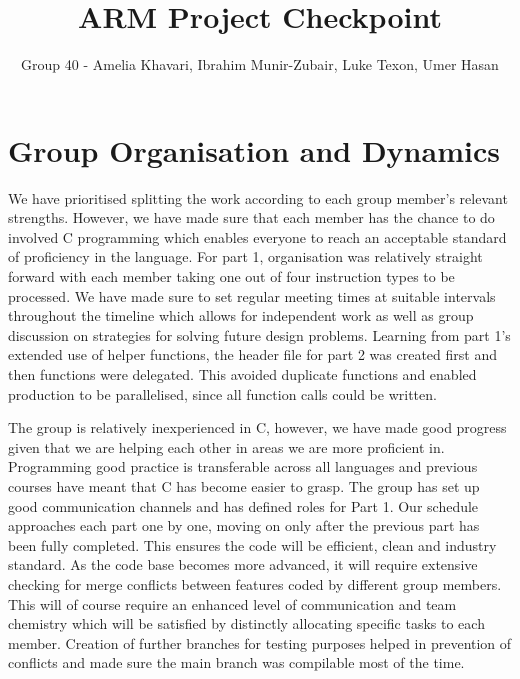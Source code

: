 \documentclass[11pt]{article}
\begin{document}
\title{ARM Project Checkpoint}
\author{Group 40 - Amelia Khavari, Ibrahim Munir-Zubair, Luke Texon, Umer Hasan}

\maketitle

\section{Group Organisation and Dynamics}

We have prioritised splitting the work according to each group member's relevant strengths. However, we have made sure that each member has the chance to do involved C programming which enables everyone to reach an acceptable standard of proficiency in the language. For part 1, organisation was relatively straight forward with each member taking one out of four instruction types to be processed. We have made sure to set regular meeting times at suitable intervals throughout the timeline which allows for independent work as well as group discussion on strategies for solving future design problems. Learning from part 1's extended use of helper functions, the header file for part 2 was created first and then functions were delegated. This avoided duplicate functions and enabled production to be parallelised, since all function calls could be written.  \newline

The group is relatively inexperienced in C, however, we have made good progress given that we are helping each other in areas we are more proficient in. Programming good practice is transferable across all languages and previous courses have meant that C has become easier to grasp. The group has set up good communication channels and has defined roles for Part 1. Our schedule approaches each part one by one, moving on only after the previous part has been fully completed. This ensures the code will be efficient, clean and industry standard. As the code base becomes more advanced, it will require extensive checking for merge conflicts between features coded by different group members. This will of course require an enhanced level of communication and team chemistry which will be satisfied by distinctly allocating specific tasks to each member. Creation of further branches for testing purposes helped in prevention of conflicts and made sure the main branch was compilable most of the time. 
\end{document}
